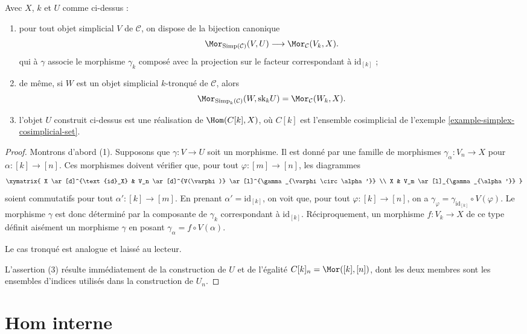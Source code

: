 \begin{lemma}
\label{lemma-morphism-into-product}
Avec $X$, $k$ et $U$ comme ci-dessus :
\begin{enumerate}
\item pour tout objet simplicial $V$ de $\mathcal{C}$, on dispose de la
bijection canonique
$$
\Mor_{\text{Simp}(\mathcal{C})}(V, U)
\longrightarrow
\Mor_\mathcal{C}(V_k, X).
$$
qui à $\gamma$ associe le morphisme $\gamma_k$ composé avec la projection
sur le facteur correspondant à $\text{id}_{[k]}$ ;
\item de même, si $W$ est un objet simplicial $k$-tronqué de
$\mathcal{C}$, alors
$$
\Mor_{\text{Simp}_k(\mathcal{C})}(W, \text{sk}_k U)
=
\Mor_\mathcal{C}(W_k, X).
$$
\item l'objet $U$ construit ci-dessus est une réalisation de
$\Hom(C[k], X)$, où $C[k]$ est l'ensemble cosimplicial de l'exemple
\ref{example-simplex-cosimplicial-set}.
\end{enumerate}
\end{lemma}

\begin{proof}
Montrons d'abord (1). Supposons que $\gamma : V \to U$ soit un morphisme.
Il est donné par une famille de morphismes
$\gamma_{\alpha} : V_n \to X$ pour $\alpha : [k] \to [n]$.
Ces morphismes doivent vérifier que, pour tout
$\varphi : [m] \to [n]$, les diagrammes
$$
\xymatrix{
X \ar[d]^{\text{id}_X} &
V_n \ar[d]^{V(\varphi)}
\ar[l]^{\gamma_{\varphi \circ \alpha'}} \\
X &
V_m \ar[l]_{\gamma_{\alpha'}}
}
$$
soient commutatifs pour tout $\alpha' : [k] \to [m]$.
En prenant $\alpha' = \text{id}_{[k]}$, on voit que, pour tout
$\varphi : [k] \to [n]$, on a $\gamma_\varphi =
\gamma_{\text{id}_{[k]}} \circ V(\varphi)$. Le morphisme $\gamma$ est
donc déterminé par la composante de $\gamma_k$ correspondant à
$\text{id}_{[k]}$. Réciproquement, un morphisme $f : V_k \to X$ de ce
type définit aisément un morphisme $\gamma$ en posant
$\gamma_\alpha = f \circ V(\alpha)$.

\medskip\noindent
Le cas tronqué est analogue et laissé au lecteur.

\medskip\noindent
L'assertion (3) résulte immédiatement de la construction de $U$ et de
l'égalité $C[k]_n = \Mor([k], [n])$, dont les deux membres sont les
ensembles d'indices utilisés dans la construction de $U_n$.
\end{proof}




\section{Hom interne}
\label{section-internal-hom}

